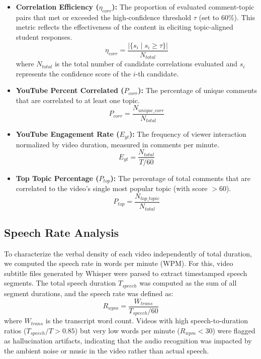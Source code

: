 \begin{itemize}
    \item \textbf{Correlation Efficiency ($\eta_{corr}$):} The proportion of evaluated comment-topic pairs that met or exceeded the high-confidence threshold $\tau$ (set to 60\%). This metric reflects the effectiveness of the content in eliciting topic-aligned student responses.
    \begin{equation}
        \eta_{corr} = \frac{|\{s_i \mid s_i \ge \tau\}|}{N_{total}}
    \end{equation}
    where $N_{total}$ is the total number of candidate correlations evaluated and $s_i$ represents the confidence score of the $i$-th candidate.

    \item \textbf{YouTube Percent Correlated ($P_{corr}$):} The percentage of unique comments that are correlated to at least one topic.
    \begin{equation}
        P_{corr} = \frac{N_{unique\_corr}}{N_{total}}
    \end{equation}

    \item \textbf{YouTube Engagement Rate ($E_{yt}$):} The frequency of viewer interaction normalized by video duration, measured in comments per minute.
    \begin{equation}
        E_{yt} = \frac{N_{total}}{T / 60}
    \end{equation}

    \item \textbf{Top Topic Percentage ($P_{top}$):} The percentage of total comments that are correlated to the video's single most popular topic (with score $> 60$).
    \begin{equation}
        P_{top} = \frac{N_{top\_topic}}{N_{total}}
    \end{equation}
\end{itemize}

\subsection{Speech Rate Analysis}

To characterize the verbal density of each video independently of total duration, we computed the speech rate in words per minute (WPM). For this, video subtitle files generated by Whisper were parsed to extract timestamped speech segments. The total speech duration $T_{speech}$ was computed as the sum of all segment durations, and the speech rate was defined as:
\begin{equation}
    R_{wpm} = \frac{W_{trans}}{T_{speech} / 60}
\end{equation}
where $W_{trans}$ is the transcript word count. Videos with high speech-to-duration ratios ($T_{speech} / T > 0.85$) but very low words per minute ($R_{wpm} < 30$) were flagged as hallucination artifacts, indicating that the audio recognition was impacted by the ambient noise or music in the video rather than actual speech.


